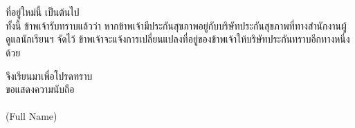 \documentclass[a4paper,13pt]{article}
\begin{document}
\begin{itemize}[label={}]
  \indent\hspace{0.7in}\phantom{ที่อยู่ใหม่} \\
  \indent\hspace{0.7in}\phantom{ที่อยู่ใหม่} \\
  \indent\hspace{0.7in}ที่อยู่ใหม่นี้  เป็นต้นไป \\
  \indent\hspace{0.7in}ทั้งนี้ ข้าพเจ้ารับทราบแล้วว่า หากข้าพเจ้ามีประกันสุขภาพอยู่กับบริษัทประกันสุขภาพที่ทางสำนักงานผู้ดูแลนักเรียนฯ จัดไว้ ข้าพเจ้าจะแจ้งการเปลี่ยนแปลงที่อยู่ของข้าพเจ้าให้บริษัทประกันทราบอีกทางหนึ่งด้วย
\end{itemize}
จึงเรียนมาเพื่อโปรดทราบ \\

\noindent
ขอแสดงความนับถือ \\
 \\
(Full Name) \\

\newpage
\end{document}
